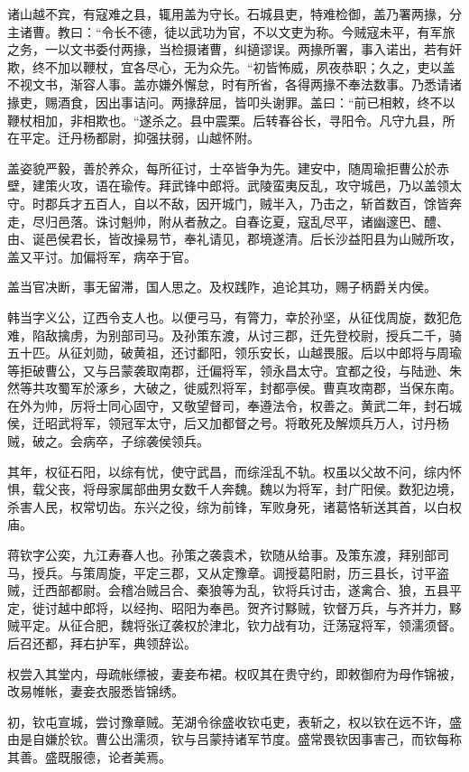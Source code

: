 \documentclass[12pt,UTF8]{ctexbook}
\begin{document}
诸山越不宾，有寇难之县，辄用盖为守长。石城县吏，特难检御，盖乃署两掾，分主诸曹。教曰：“令长不德，徒以武功为官，不以文吏为称。今贼寇未平，有军旅之务，一以文书委付两掾，当检摄诸曹，纠擿谬误。两掾所署，事入诺出，若有奸欺，终不加以鞭杖，宜各尽心，无为众先。“初皆怖威，夙夜恭职；久之，吏以盖不视文书，渐容人事。盖亦嫌外懈怠，时有所省，各得两掾不奉法数事。乃悉请诸掾吏，赐酒食，因出事诘问。两掾辞屈，皆叩头谢罪。盖曰：“前已相敕，终不以鞭杖相加，非相欺也。“遂杀之。县中震栗。后转春谷长，寻阳令。凡守九县，所在平定。迁丹杨都尉，抑强扶弱，山越怀附。

盖姿貌严毅，善於养众，每所征讨，士卒皆争为先。建安中，随周瑜拒曹公於赤壁，建策火攻，语在瑜传。拜武锋中郎将。武陵蛮夷反乱，攻守城邑，乃以盖领太守。时郡兵才五百人，自以不敌，因开城门，贼半入，乃击之，斩首数百，馀皆奔走，尽归邑落。诛讨魁帅，附从者赦之。自春讫夏，寇乱尽平，诸幽邃巴、醴、由、诞邑侯君长，皆改操易节，奉礼请见，郡境遂清。后长沙益阳县为山贼所攻，盖又平讨。加偏将军，病卒于官。

盖当官决断，事无留滞，国人思之。及权践阼，追论其功，赐子柄爵关内侯。

韩当字义公，辽西令支人也。以便弓马，有膂力，幸於孙坚，从征伐周旋，数犯危难，陷敌擒虏，为别部司马。及孙策东渡，从讨三郡，迁先登校尉，授兵二千，骑五十匹。从征刘勋，破黄祖，还讨鄱阳，领乐安长，山越畏服。后以中郎将与周瑜等拒破曹公，又与吕蒙袭取南郡，迁偏将军，领永昌太守。宜都之役，与陆逊、朱然等共攻蜀军於涿乡，大破之，徙威烈将军，封都亭侯。曹真攻南郡，当保东南。在外为帅，厉将士同心固守，又敬望督司，奉遵法令，权善之。黄武二年，封石城侯，迁昭武将军，领冠军太守，后又加都督之号。将敢死及解烦兵万人，讨丹杨贼，破之。会病卒，子综袭侯领兵。

其年，权征石阳，以综有忧，使守武昌，而综淫乱不轨。权虽以父故不问，综内怀惧，载父丧，将母家属部曲男女数千人奔魏。魏以为将军，封广阳侯。数犯边境，杀害人民，权常切齿。东兴之役，综为前锋，军败身死，诸葛恪斩送其首，以白权庙。

蒋钦字公奕，九江寿春人也。孙策之袭袁术，钦随从给事。及策东渡，拜别部司马，授兵。与策周旋，平定三郡，又从定豫章。调授葛阳尉，历三县长，讨平盗贼，迁西部都尉。会稽冶贼吕合、秦狼等为乱，钦将兵讨击，遂禽合、狼，五县平定，徙讨越中郎将，以经拘、昭阳为奉邑。贺齐讨黟贼，钦督万兵，与齐并力，黟贼平定。从征合肥，魏将张辽袭权於津北，钦力战有功，迁荡寇将军，领濡须督。后召还都，拜右护军，典领辞讼。

权尝入其堂内，母疏帐缥被，妻妾布裙。权叹其在贵守约，即敕御府为母作锦被，改易帷帐，妻妾衣服悉皆锦绣。

初，钦屯宣城，尝讨豫章贼。芜湖令徐盛收钦屯吏，表斩之，权以钦在远不许，盛由是自嫌於钦。曹公出濡须，钦与吕蒙持诸军节度。盛常畏钦因事害己，而钦每称其善。盛既服德，论者美焉。
\end{document}
